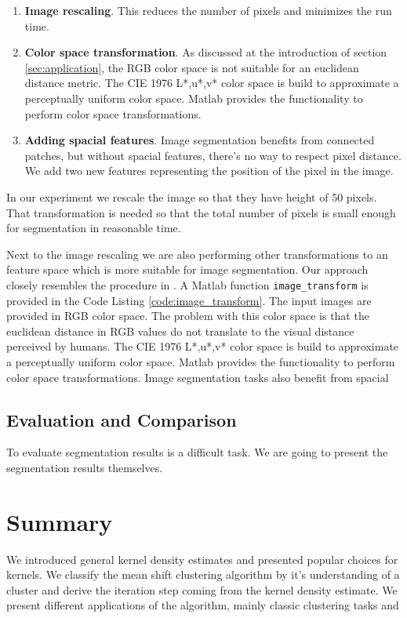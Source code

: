 \documentclass{article}
\begin{document}
\begin{enumerate}
	\item \textbf{Image rescaling}. This reduces the number of pixels and minimizes the run time.
	\item \textbf{Color space transformation}. As discussed at the introduction of section \ref{sec:application}, the RGB color space is not suitable for an euclidean distance metric. The CIE 1976 L*,u*,v* color space is build to approximate a perceptually uniform color space. Matlab provides the functionality to perform color space transformations.
	\item \textbf{Adding spacial features}. Image segmentation benefits from connected patches, but without spacial features, there's no way to respect pixel distance. We add two new features representing the position of the pixel in the image.
\end{enumerate}

In our experiment we rescale the image so that they have height of 50 pixels. That transformation is needed so that the total number of pixels is small enough for segmentation in reasonable time.

Next to the image rescaling we are also performing other transformations to an feature space which is more suitable for image segmentation. Our approach closely resembles the procedure in \cite{Comaniciu.2002}. A Matlab function \texttt{image\_transform} is provided in the Code Listing \ref{code:image_transform}. The input images are provided in RGB color space. The problem with this color space is that the euclidean distance in RGB values do not translate to the visual distance perceived by humans. The CIE 1976 L*,u*,v* color space is build to approximate a perceptually uniform color space. Matlab provides the functionality to perform color space transformations. Image segmentation tasks also benefit from spacial 

\subsection{Evaluation and Comparison}

To evaluate segmentation results is a difficult task. We are going to present the segmentation results themselves.

\section{Summary}

We introduced general kernel density estimates and presented popular choices for kernels. We classify the mean shift clustering algorithm by it's understanding of a cluster and derive the iteration step coming from the kernel density estimate. We present different applications of the algorithm, mainly classic clustering tasks and
\end{document}
